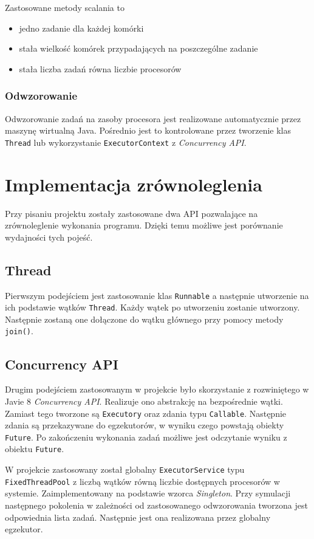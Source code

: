 \documentclass{mwart}
\begin{document}
Zastosowane metody scalania to
\begin{itemize}
  \item jedno zadanie dla każdej komórki
  \item stała wielkość komórek przypadających na poszczególne zadanie
  \item stała liczba zadań równa liczbie procesorów
\end{itemize}

\subsubsection{Odwzorowanie}
Odwzorowanie zadań na zasoby procesora jest realizowane automatycznie przez maszynę wirtualną Java. Pośrednio jest to kontrolowane przez tworzenie klas \texttt{Thread} lub wykorzystanie \texttt{ExecutorContext} z \textit{Concurrency API}.

\section{Implementacja zrównoleglenia}
Przy pisaniu projektu zostały zastosowane dwa API pozwalające na zrównoleglenie wykonania programu. Dzięki temu możliwe jest porównanie wydajności tych pojeść.

\subsection{Thread}
Pierwszym podejściem jest zastosowanie klas \texttt{Runnable} a następnie utworzenie na ich podstawie wątków \texttt{Thread}. Każdy wątek po utworzeniu zostanie utworzony. Następnie zostaną one dołączone do wątku głównego przy pomocy metody \texttt{join()}.

\subsection{Concurrency API}
Drugim podejściem zastosowanym w projekcie było skorzystanie z rozwiniętego w Javie 8 \textit{Concurrency API}. Realizuje ono abstrakcję na bezpośrednie wątki. Zamiast tego tworzone są \texttt{Executory} oraz zdania typu \texttt{Callable}. Następnie zdania są przekazywane do egzekutorów, w wyniku czego powstają obiekty \texttt{Future}. Po zakończeniu wykonania zadań możliwe jest odczytanie wyniku z obiektu \texttt{Future}.

W projekcie zastosowany został globalny \texttt{ExecutorService} typu \\ \texttt{FixedThreadPool} z liczbą wątków równą liczbie dostępnych procesorów w systemie. Zaimplementowany na podstawie wzorca \textit{Singleton}.
Przy symulacji następnego pokolenia w zależności od zastosowanego odwzorowania tworzona jest odpowiednia lista zadań. Następnie jest ona realizowana przez globalny egzekutor.
\end{document}
